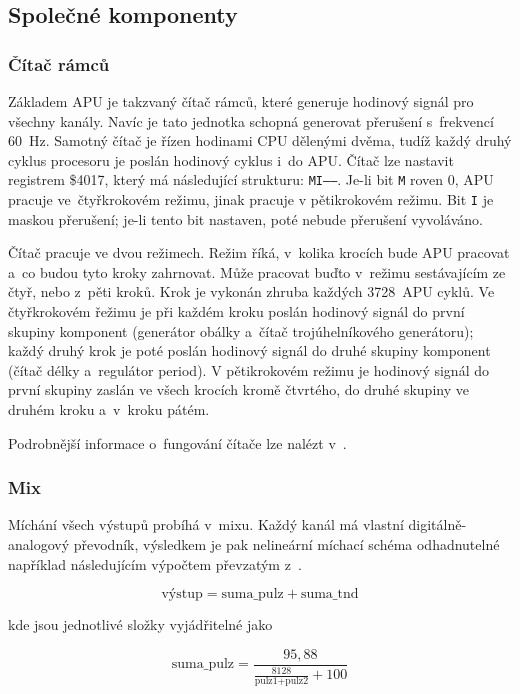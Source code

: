 \subsection{Společné komponenty}
\subsubsection{Čítač rámců}
\label{sec:analyza-citac-ramcu}
Základem APU je takzvaný čítač rámců, které generuje hodinový signál pro všechny kanály. Navíc je tato jednotka schopná generovat přerušení s~frekvencí 60~Hz. Samotný čítač je řízen hodinami CPU dělenými dvěma, tudíž každý druhý cyklus procesoru je poslán hodinový cyklus i~do APU. Čítač lze nastavit registrem \$4017, který má následující strukturu: \texttt{MI------}. Je-li bit \texttt{M} roven 0, APU pracuje ve~čtyřkrokovém režimu, jinak pracuje v pětikrokovém režimu. Bit \texttt{I} je maskou přerušení; je-li tento bit nastaven, poté nebude přerušení vyvoláváno.~\cite{Nesdev:apu-frame-counter}

Čítač pracuje ve dvou režimech. Režim říká, v~kolika krocích bude APU pracovat a~co budou tyto kroky zahrnovat. Může pracovat buďto v~režimu sestávajícím ze čtyř, nebo z~pěti kroků. Krok je vykonán zhruba každých 3728~APU cyklů. Ve čtyřkrokovém řežimu je při každém kroku poslán hodinový signál do první skupiny komponent (generátor obálky a~čítač trojúhelníkového generátoru); každý druhý krok je poté poslán hodinový signál do druhé skupiny komponent (čítač délky a~regulátor period). V pětikrokovém režimu je hodinový signál do první skupiny zaslán ve všech krocích kromě čtvrtého, do druhé skupiny ve druhém kroku a~v~kroku pátém.~\cite{Nesdev:apu-frame-counter}

Podrobnější informace o~fungování čítače lze nalézt v~\cite{Nesdev:apu-frame-counter}.

\subsubsection{Mix}
Míchání všech výstupů probíhá v~mixu. Každý kanál má vlastní digitálně-analogový převodník, výsledkem je pak nelineární míchací schéma odhadnutelné například následujícím výpočtem převzatým z~\cite{Nesdev:apu-mixer}.

\[\textrm{výstup} = \textrm{suma\_pulz} + \textrm{suma\_tnd}\]
	
kde jsou jednotlivé složky vyjádřitelné jako
	
\[\textrm{suma\_pulz} = \frac{95,88}{\frac{8128}{\textrm{pulz1} + \textrm{pulz2}} + 100}\]

